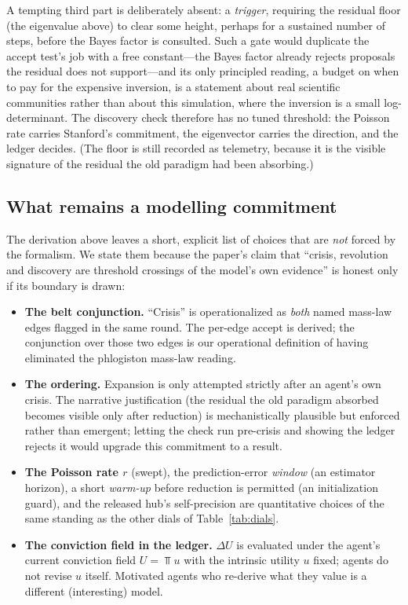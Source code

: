 A tempting third part is deliberately absent: a \emph{trigger}, requiring the residual floor
(the eigenvalue above) to clear some height, perhaps for a sustained number of steps, before
the Bayes factor is consulted. Such a gate would duplicate the accept test's job with a free
constant---the Bayes factor already rejects proposals the residual does not support---and its
only principled reading, a budget on when to pay for the expensive inversion, is a statement
about real scientific communities rather than about this simulation, where the inversion is a
small log-determinant. The discovery check therefore has no tuned threshold: the Poisson rate
carries Stanford's commitment, the eigenvector carries the direction, and the ledger decides.
(The floor is still recorded as telemetry, because it is the visible signature of the residual
the old paradigm had been absorbing.)

\subsection{What remains a modelling commitment}

The derivation above leaves a short, explicit list of choices that are \emph{not} forced by the
formalism. We state them because the paper's claim that ``crisis, revolution and discovery are
threshold crossings of the model's own evidence'' is honest only if its boundary is drawn:

\begin{itemize}
\item \textbf{The belt conjunction.} ``Crisis'' is operationalized as \emph{both} named
mass-law edges flagged in the same round. The per-edge accept is derived; the conjunction over
those two edges is our operational definition of having eliminated the phlogiston mass-law
reading.
\item \textbf{The ordering.} Expansion is only attempted strictly after an agent's own crisis.
The narrative justification (the residual the old paradigm absorbed becomes visible only after
reduction) is mechanistically plausible but enforced rather than emergent; letting the check
run pre-crisis and showing the ledger rejects it would upgrade this commitment to a result.
\item \textbf{The Poisson rate $r$} (swept), the prediction-error \emph{window} (an estimator
horizon), a short \emph{warm-up} before reduction is permitted (an initialization guard), and
the released hub's self-precision are quantitative choices of the same standing as the other
dials of Table~\ref{tab:dials}.
\item \textbf{The conviction field in the ledger.} $\Delta U$ is evaluated under the agent's
current conviction field $U=\Top u$ with the intrinsic utility $u$ fixed; agents do not revise
$u$ itself. Motivated agents who re-derive what they value is a different (interesting) model.
\end{itemize}

